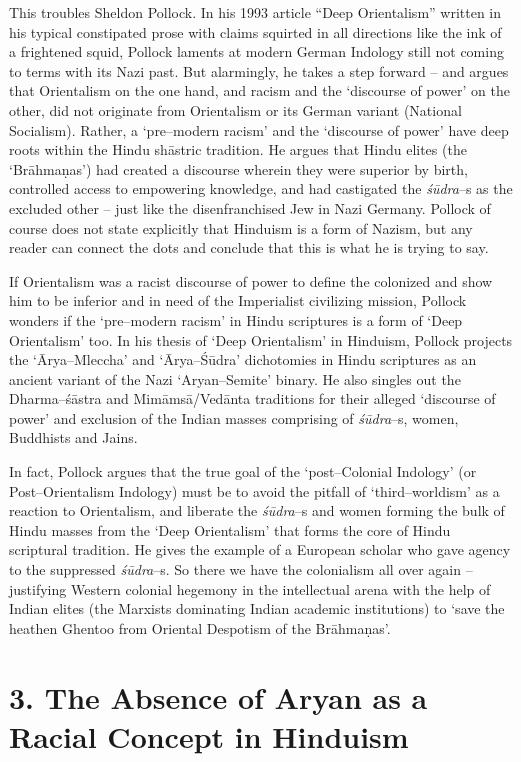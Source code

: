 This troubles Sheldon Pollock. In his 1993 article “Deep Orientalism” written in his typical constipated prose with claims squirted in all directions like the ink of a frightened squid, Pollock laments at modern German Indology still not coming to terms with its Nazi past. But alarmingly, he takes a step forward – and argues that Orientalism on the one hand, and racism and the ‘discourse of power’ on the other, did not originate from Orientalism or its German variant (National Socialism). Rather, a ‘pre–modern racism’ and the ‘discourse of power’ have deep roots within the Hindu shāstric tradition. He argues that Hindu elites (the ‘Brāhmaṇas’) had created a discourse wherein they were superior by birth, controlled access to empowering knowledge, and had castigated the \textit{śūdra}–s as the excluded other – just like the disenfranchised Jew in Nazi Germany. Pollock of course does not state explicitly that Hinduism is a form of Nazism, but any reader can connect the dots and conclude that this is what he is trying to say.

If Orientalism was a racist discourse of power to define the colonized and show him to be inferior and in need of the Imperialist civilizing mission, Pollock wonders if the ‘pre–modern racism’ in Hindu scriptures is a form of ‘Deep Orientalism’ too. In his thesis of ‘Deep Orientalism’ in Hinduism, Pollock projects the ‘Ārya–Mleccha’ and ‘Ārya–Śūdra’ dichotomies in Hindu scriptures as an ancient variant of the Nazi ‘Aryan–Semite’ binary. He also singles out the Dharma–śāstra and Mimāmsā/Vedānta traditions for their alleged ‘discourse of power’ and exclusion of the Indian masses comprising of \textit{śūdra}–s, women, Buddhists and Jains.

In fact, Pollock argues that the true goal of the ‘post–Colonial Indology’ (or Post–Orientalism Indology) must be to avoid the pitfall of ‘third–worldism’ as a reaction to Orientalism, and liberate the \textit{śūdra}–s and women forming the bulk of Hindu masses from the ‘Deep Orientalism’ that forms the core of Hindu scriptural tradition. He gives the example of a European scholar who gave agency to the suppressed \textit{śūdra}–s. So there we have the colonialism all over again – justifying Western colonial hegemony in the intellectual arena with the help of Indian elites (the Marxists dominating Indian academic institutions) to ‘save the heathen Ghentoo from Oriental Despotism of the Brāhmaṇas’.


\section*{3. The Absence of Aryan as a Racial Concept in Hinduism}

